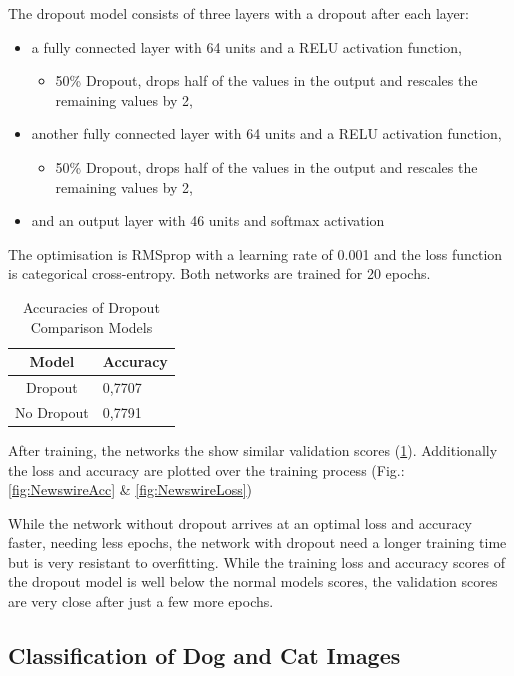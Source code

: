 \documentclass[sigconf, nonacm]{acmart}
\begin{document}
The dropout model consists of three layers with a dropout after each layer:
\begin{itemize}
\item a fully connected layer with 64 units and a RELU activation function,
\begin{itemize}
	\item 50\% Dropout, drops half of the values in the output and rescales the remaining values by 2,
\end{itemize}
\item another fully connected layer with 64 units and a RELU activation function,
\begin{itemize}
	\item 50\% Dropout, drops half of the values in the output and rescales the remaining values by 2,
\end{itemize}
\item and an output layer with 46 units and softmax activation
\end{itemize}
The optimisation is RMSprop with a learning rate of 0.001 and the loss function is categorical cross-entropy.
Both networks are trained for 20 epochs.

\begin{table}[h]
  \caption{Accuracies of Dropout Comparison Models}
  \label{tab:dropoutAccuracy}
  \begin{tabular}{ c | l }
    \toprule
    Model & Accuracy \\
    \midrule
    Dropout & 0,7707 \\
	No Dropout & 0,7791 \\
  	\bottomrule
  \end{tabular}
\end{table}

After training, the networks the show similar validation scores (\ref{tab:dropoutAccuracy}).
Additionally the loss and accuracy are plotted over the training process (Fig.: \ref{fig:NewswireAcc} \& \ref{fig:NewswireLoss})

While the network without dropout arrives at an optimal loss and accuracy faster, needing less epochs, the network with dropout need a longer training time but is very resistant to overfitting.
While the training loss and accuracy scores of the dropout model is well below the normal models scores, the validation scores are very close after just a few more epochs.

\subsection{Classification of Dog and Cat Images}
\end{document}
